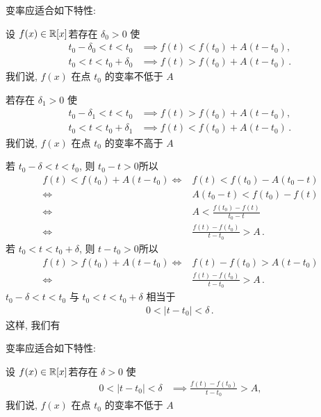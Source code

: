 \begin{proposition}
    变率应适合如下特性:

    设 $f (x) \in \mathbb{R}[x]$\period 若存在 $\delta_0 > 0$ 使
    \begin{align*}
        t_0 - \delta_0 < t < t_0 & \implies f (t) < f(t_0) + A (t - t_0),        \\
        t_0 < t < t_0 + \delta_0 & \implies f (t) > f(t_0) + A (t - t_0) \period
    \end{align*}
    我们说, $f (x)$ 在点 $t_0$ 的变率不低于 $A$\period

    若存在 $\delta_1 > 0$ 使
    \begin{align*}
        t_0 - \delta_1 < t < t_0 & \implies f (t) > f(t_0) + A (t - t_0),        \\
        t_0 < t < t_0 + \delta_1 & \implies f (t) < f(t_0) + A (t - t_0) \period
    \end{align*}
    我们说, $f (x)$ 在点 $t_0$ 的变率不高于 $A$\period
\end{proposition}

若 $t_0 - \delta < t < t_0$, 则 $t_0 - t > 0$\period 所以
\begin{align*}
    f (t) < f(t_0) + A (t - t_0)
    \iff {} & f (t) < f(t_0) - A (t_0 - t)              \\
    \iff {} & A (t_0 - t) < f(t_0) - f(t)               \\
    \iff {} & A < \frac{f(t_0) - f(t)}{t_0 - t}         \\
    \iff {} & \frac{f(t) - f(t_0)}{t - t_0} > A \period
\end{align*}
若 $t_0 < t < t_0 + \delta$, 则 $t - t_0 > 0$\period 所以
\begin{align*}
    f (t) > f(t_0) + A (t - t_0)
    \iff {} & f(t) - f(t_0) > A (t - t_0)               \\
    \iff {} & \frac{f(t) - f(t_0)}{t - t_0} > A \period
\end{align*}
$t_0 - \delta < t < t_0$ 与 $t_0 < t < t_0 + \delta$ 相当于
\begin{align*}
    0 < |t - t_0| < \delta \period
\end{align*}
这样, 我们有

\begin{proposition}
    变率应适合如下特性:

    设 $f (x) \in \mathbb{R}[x]$\period 若存在 $\delta > 0$ 使
    \begin{align*}
        0 < |t - t_0| < \delta & \implies \frac{f(t) - f(t_0)}{t - t_0} > A,
    \end{align*}
    我们说, $f (x)$ 在点 $t_0$ 的变率不低于 $A$\period
\end{proposition}

